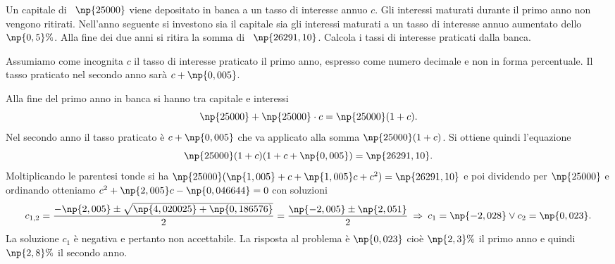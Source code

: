 \begin{problema}
Un capitale di \officialeuro~$\np{25000}$ viene depositato in banca a un tasso di interesse annuo $c$. Gli interessi maturati durante il primo anno non vengono ritirati.
Nell'anno seguente si investono sia il capitale sia gli interessi maturati a un tasso di interesse annuo aumentato dello $\np{0,5}\%$. Alla fine dei due anni si ritira
la somma di \officialeuro~$\np{26291,10}$. Calcola i tassi di interesse praticati dalla banca.
\end{problema}
Assumiamo come incognita $c$ il tasso di interesse praticato il primo anno, espresso come numero decimale e
non in forma percentuale. Il tasso praticato nel secondo anno sarà $c+\np{0,005}$.

\begin{soluzione}
Alla fine del primo anno in banca si hanno tra capitale e interessi \[\np{25000} + \np{25000} \cdot c = \np{25000} ( 1 + c ).\] Nel secondo anno il tasso praticato è $c+\np{0,005}$ che va applicato alla somma $\np{25000}(1+c)$. Si ottiene quindi l'equazione \[\np{25000} ( 1 + c ) ( 1 + c + \np{0,005} ) = \np{26291,10}.\]
Moltiplicando le parentesi tonde si ha $\np{25000} ( \np{1,005} + c + \np{1,005} c + c^{2} ) = \np{26291,10}$ e poi dividendo per $\np{25000}$ e ordinando otteniamo
$c^{2} + \np{2,005} c - \np{0,046644}=0$ con soluzioni
\[c_{1\text{,}2} = \dfrac{- \np{2,005} \pm \sqrt{\np{4,020025} + \np{0,186576}}}{2} = \dfrac{\np{-2,005} \pm \np{2,051}}{2}\:\Rightarrow\: c_{1} = \np{-2,028} \vee c_{2} = \np{0,023}.\]
La soluzione $c_1$ è negativa e pertanto non accettabile. La risposta al problema è $\np{0,023}$ cioè $\np{2,3}\%$ il primo anno e quindi $\np{2,8}\%$ il secondo anno.
\end{soluzione}

\vspazio\ovalbox{\risolvii \ref{ese:3.112}, \ref{ese:3.113}, \ref{ese:3.114}, \ref{ese:3.115}, \ref{ese:3.116}, \ref{ese:3.117}, \ref{ese:3.118}, \ref{ese:3.119}, \ref{ese:3.120}, \ref{ese:3.121}, \ref{ese:3.122},}

\vspazio\ovalbox{\ref{ese:3.123}, \ref{ese:3.124}, \ref{ese:3.125}, \ref{ese:3.126}, \ref{ese:3.127}, \ref{ese:3.128}, \ref{ese:3.129}, \ref{ese:3.130}, \ref{ese:3.131}, \ref{ese:3.132}, \ref{ese:3.133}, \ref{ese:3.134}, \ref{ese:3.135}, \ref{ese:3.136},}

\vspazio\ovalbox{\ref{ese:3.137}, \ref{ese:3.138}, \ref{ese:3.139}, \ref{ese:3.140}, \ref{ese:3.141}, \ref{ese:3.142}, \ref{ese:3.143}, \ref{ese:3.144}, \ref{ese:3.145}, \ref{ese:3.146}, \ref{ese:3.147}, \ref{ese:3.148}, \ref{ese:3.149}, \ref{ese:3.150}}

